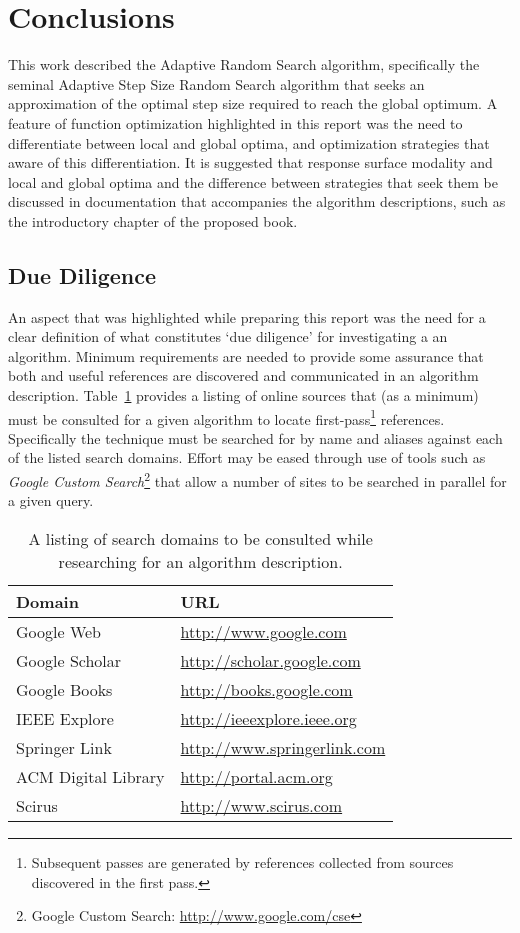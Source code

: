 \documentclass[a4paper, 11pt]{article}
\begin{document}
% 
% 
\section{Conclusions}
\label{sec:conclusions}
This work described the Adaptive Random Search algorithm, specifically the seminal Adaptive Step Size Random Search algorithm that seeks an approximation of the optimal step size required to reach the global optimum.
A feature of function optimization highlighted in this report was the need to differentiate between local and global optima, and optimization strategies that aware of this differentiation. It is suggested that response surface modality and local and global optima and the difference between strategies that seek them be discussed in documentation that accompanies the algorithm descriptions, such as the introductory chapter of the proposed book.

\subsection{Due Diligence}
An aspect that was highlighted while preparing this report was the need for a clear definition of what constitutes `due diligence' for investigating a an algorithm. Minimum requirements are needed to provide some assurance that both and useful references are discovered and communicated in an algorithm description. Table~\ref{tab:due_diligence} provides a listing of online sources that (as a minimum) must be consulted for a given algorithm to locate first-pass\footnote{Subsequent passes are generated by references collected from sources discovered in the first pass.} references. Specifically the technique must be searched for by name and aliases against each of the listed search domains. Effort may be eased through use of tools such as \emph{Google Custom Search}\footnote{Google Custom Search: \url{http://www.google.com/cse}} that allow a number of sites to be searched in parallel for a given query.

\begin{table}[htp]
	\centering
		\begin{tabularx}{\textwidth}{lX}
		\toprule
		\textbf{Domain} & \textbf{URL} \\ 
		\toprule
		Google Web & \url{http://www.google.com} \\
		Google Scholar & \url{http://scholar.google.com} \\
		Google Books & \url{http://books.google.com} \\
		IEEE Explore & \url{http://ieeexplore.ieee.org} \\
		Springer Link & \url{http://www.springerlink.com} \\	
		ACM Digital Library & \url{http://portal.acm.org} \\	
		Scirus & \url{http://www.scirus.com} \\
		\bottomrule
		\end{tabularx}	
	\caption{A listing of search domains to be consulted while researching for an algorithm description.}
	\label{tab:due_diligence}
\end{table}
\end{document}
